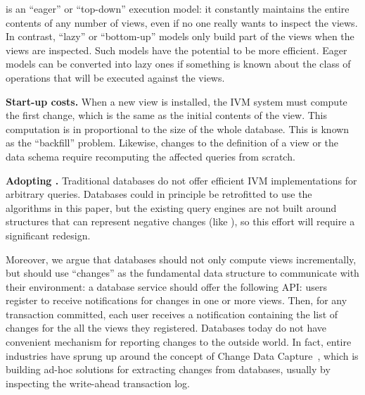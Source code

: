 \dbsp is an ``eager'' or ``top-down'' execution model: it constantly
maintains the entire contents of any number of views, even if no one
really wants to inspect the views.  In contrast, ``lazy'' or
``bottom-up'' models only build part of the views when the views are
inspected.  Such models have the potential to be more efficient.
Eager models can be converted into lazy ones if something is known
about the class of operations that will be executed against the views.

\textbf{Start-up costs.}  When a new view is installed, the IVM system
must compute the first change, which is the same as the initial
contents of the view.  This computation is in proportional to the size
of the whole database.  This is known as the ``backfill'' problem.
Likewise, changes to the definition of a view or the data schema
require recomputing the affected queries from scratch.

\textbf{Adopting \dbsp.} Traditional databases do not offer efficient
IVM implementations for arbitrary queries.  Databases could in
principle be retrofitted to use the algorithms in this paper, but the
existing query engines are not built around structures that can
represent negative changes (like \zrs), so this effort will require a
significant redesign.

Moreover, we argue that databases should not only compute views
incrementally, but should use ``changes'' as the fundamental data
structure to communicate with their environment: a database service
should offer the following API: users register to receive
notifications for changes in one or more views.  Then, for any
transaction committed, each user receives a notification containing
the list of changes for the all the views they registered.  Databases
today do not have convenient mechanism for reporting changes to the
outside world.  In fact, entire industries have sprung up around the
concept of Change Data Capture~\cite{cdc}, which is building ad-hoc
solutions for extracting changes from databases, usually by inspecting
the write-ahead transaction log.

